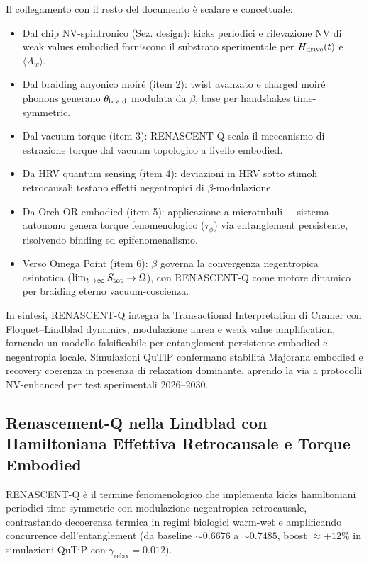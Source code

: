 \documentclass[11pt,a4paper]{article}
\theoremstyle{plain}
\theoremstyle{definition}
\begin{document}
Il collegamento con il resto del documento è scalare e concettuale:

\begin{itemize}
    \item Dal chip NV-spintronico (Sez. design): kicks periodici e rilevazione NV di weak values embodied forniscono il substrato sperimentale per $H_{\rm drive}(t)$ e $\langle A_w \rangle$.
    \item Dal braiding anyonico moiré (item 2): twist avanzato e charged moiré phonons generano $\theta_{\rm braid}$ modulata da $\beta$, base per handshakes time-symmetric.
    \item Dal vacuum torque (item 3): RENASCENT-Q scala il meccanismo di estrazione torque dal vacuum topologico a livello embodied.
    \item Da HRV quantum sensing (item 4): deviazioni in HRV sotto stimoli retrocausali testano effetti negentropici di $\beta$-modulazione.
    \item Da Orch-OR embodied (item 5): applicazione a microtubuli + sistema autonomo genera torque fenomenologico ($\tau_\phi$) via entanglement persistente, risolvendo binding ed epifenomenalismo.
    \item Verso Omega Point (item 6): $\beta$ governa la convergenza negentropica asintotica ($\lim_{t\to\infty} S_{\rm tot} \to \Omega$), con RENASCENT-Q come motore dinamico per braiding eterno vacuum-coscienza.
\end{itemize}

In sintesi, RENASCENT-Q integra la Transactional Interpretation di Cramer con Floquet–Lindblad dynamics, modulazione aurea e weak value amplification, fornendo un modello falsificabile per entanglement persistente embodied e negentropia locale. Simulazioni QuTiP confermano stabilità Majorana embodied e recovery coerenza in presenza di relaxation dominante, aprendo la via a protocolli NV-enhanced per test sperimentali 2026–2030.

\vspace{0.5cm}


\subsection{Renascement-Q nella Lindblad con Hamiltoniana Effettiva Retrocausale e Torque Embodied}
\label{sec:renascent-q-torque}

RENASCENT-Q è il termine fenomenologico che implementa kicks hamiltoniani periodici time-symmetric con modulazione negentropica retrocausale, contrastando decoerenza termica in regimi biologici warm-wet e amplificando concurrence dell'entanglement (da baseline $\sim 0.6676$ a $\sim 0.7485$, boost $\approx +12\%$ in simulazioni QuTiP con $\gamma_{\text{relax}} = 0.012$).
\end{document}
